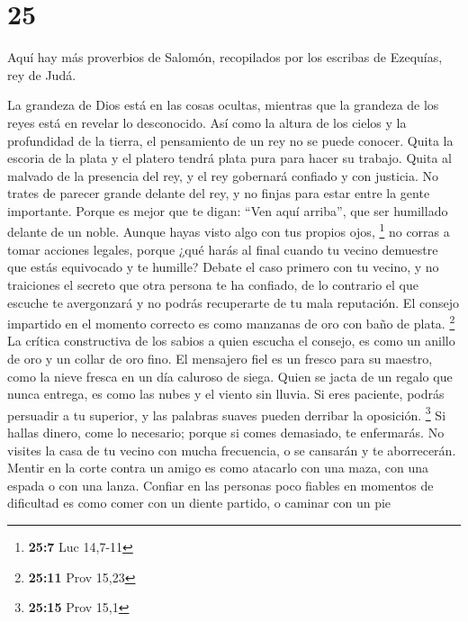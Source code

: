 \hypertarget{section-24}{%
\section{25}\label{section-24}}

 Aquí hay más proverbios de Salomón, recopilados por los
escribas de Ezequías, rey de Judá.

 La grandeza de Dios está en las cosas ocultas, mientras
que la grandeza de los reyes está en revelar lo desconocido.
 Así como la altura de los cielos y la profundidad de la
tierra, el pensamiento de un rey no se puede conocer. 
Quita la escoria de la plata y el platero tendrá plata pura para hacer
su trabajo.  Quita al malvado de la presencia del rey, y
el rey gobernará confiado y con justicia.  No trates de
parecer grande delante del rey, y no finjas para estar entre la gente
importante.  Porque es mejor que te digan: ``Ven aquí
arriba'', que ser humillado delante de un noble. Aunque hayas visto algo
con tus propios ojos, \footnote{\textbf{25:7} Luc 14,7-11}
 no corras a tomar acciones legales, porque ¿qué harás al
final cuando tu vecino demuestre que estás equivocado y te humille?
 Debate el caso primero con tu vecino, y no traiciones el
secreto que otra persona te ha confiado,  de lo contrario
el que escuche te avergonzará y no podrás recuperarte de tu mala
reputación.  El consejo impartido en el momento correcto
es como manzanas de oro con baño de plata. \footnote{\textbf{25:11} Prov
  15,23}  La crítica constructiva de los sabios a quien
escucha el consejo, es como un anillo de oro y un collar de oro fino.
 El mensajero fiel es un fresco para su maestro, como la
nieve fresca en un día caluroso de siega.  Quien se jacta
de un regalo que nunca entrega, es como las nubes y el viento sin
lluvia.  Si eres paciente, podrás persuadir a tu
superior, y las palabras suaves pueden derribar la oposición.
\footnote{\textbf{25:15} Prov 15,1}  Si hallas dinero,
come lo necesario; porque si comes demasiado, te enfermarás.
 No visites la casa de tu vecino con mucha frecuencia, o
se cansarán y te aborrecerán.  Mentir en la corte contra
un amigo es como atacarlo con una maza, con una espada o con una lanza.
 Confiar en las personas poco fiables en momentos de
dificultad es como comer con un diente partido, o caminar con un pie
